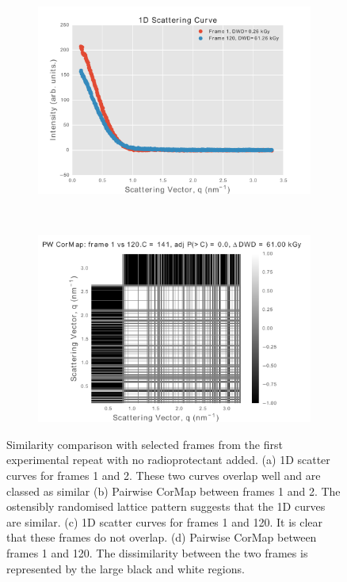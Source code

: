 \begin{figure}
    \ContinuedFloat
    \begin{subfigure}[b]{0.9\textwidth}
            \centering
            \includegraphics[width=\textwidth]{figures/saxs/scatter_curve_frames_1_120_amended.pdf}
            \caption{}
            \label{fig:1D scatter plot of frames 1 and 120}
    \end{subfigure}
    \\
    \begin{subfigure}[b]{0.9\textwidth}
            \centering
            \includegraphics[width=\textwidth]{figures/saxs/pwcormap_frames_1_120_amended.pdf}
            \caption{}
            \label{fig:Pairwise correlation frames 1 and 120}
    \end{subfigure}
    \caption[Similarity comparison with selected frames from the first experimental repeat with no radioprotectant added]{Similarity comparison with selected frames from the first experimental repeat with no radioprotectant added. (a) 1D scatter curves for frames 1 and 2. These two curves overlap well and are classed as similar (b) Pairwise CorMap between frames 1 and 2. The ostensibly randomised lattice pattern suggests that the 1D curves are similar. (c) 1D scatter curves for frames 1 and 120. It is clear that these frames do not overlap. (d) Pairwise CorMap between frames 1 and 120. The dissimilarity between the two frames is represented by the large black and white regions.}
    \label{fig:Pairwise correlation plots}
\end{figure}

